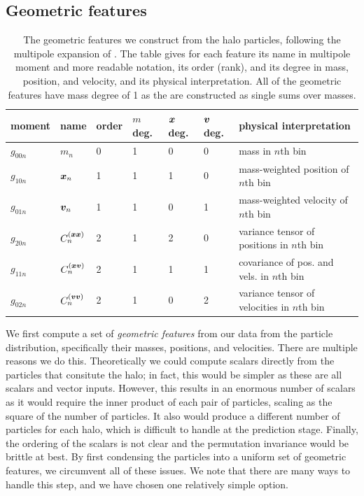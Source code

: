 
\subsection{Geometric features}
\label{sec:geometric_features}

\begin{table}
    \caption{The geometric features we construct from the \dark halo particles, following the multipole expansion of . The table gives for each feature its name in multipole moment and more readable notation, its order (rank), and its degree in mass, position, and velocity, and its physical interpretation. All of the geometric features have mass degree of 1 as the are constructed as single sums over masses.}
    \label{tab:geos}
    \vspace{0.5em}
    \centering
    \begin{tabular}{|l|l|l|l|l|l|l|}
    \hline
    moment & name & order & $m$ deg. & $\bm{x}$ deg. & $\bm{v}$ deg. & physical interpretation \\
    \hline
    $g_{00n}$ & $m_n$ & 0 & 1 & 0 & 0 & mass in $n$th bin \\
    $g_{10n}$ & $\bm{x}_n$ & 1 & 1 & 1 & 0 & mass-weighted position of $n$th bin \\
    $g_{01n}$ & $\bm{v}_n$ & 1 & 1 & 0 & 1 & mass-weighted velocity of $n$th bin \\
    $g_{20n}$ & $C^{(\bm{x}\bm{x})}_n$ & 2 & 1 & 2 & 0 & variance tensor of positions in $n$th bin \\
    $g_{11n}$ & $C^{(\bm{x}\bm{v})}_n$ & 2 & 1 & 1 & 1 & covariance of pos. and vels. in $n$th bin \\
    $g_{02n}$ & $C^{(\bm{v}\bm{v})}_n$ & 2 & 1 & 0 & 2 & variance tensor of velocities in $n$th bin \\
    \hline
    \end{tabular}
\end{table}

We first compute a set of \emph{geometric features} from our data from the particle distribution, specifically their masses, positions, and velocities. 
There are multiple reasons we do this.
Theoretically we could compute scalars directly from the particles that consitute the halo; in fact, this would be simpler as these are all scalars and vector inputs.
However, this results in an enormous number of scalars as it would require the inner product of each pair of particles, scaling as the square of the number of particles.
It also would produce a different number of particles for each halo, which is difficult to handle at the prediction stage.
Finally, the ordering of the scalars is not clear and the permutation invariance would be brittle at best.
By first condensing the particles into a uniform set of geometric features, we circumvent all of these issues.
We note that there are many ways to handle this step, and we have chosen one relatively simple option.

